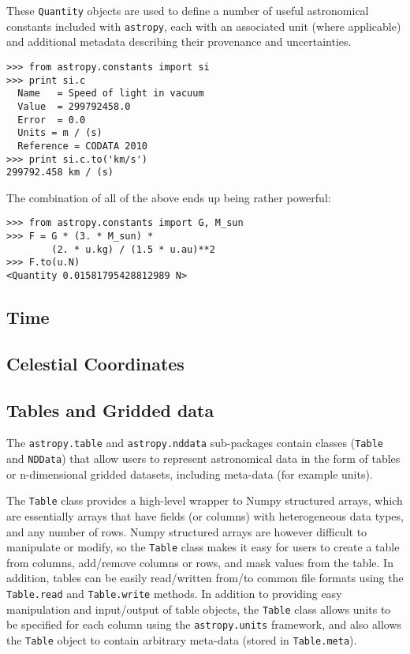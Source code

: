 \documentclass[traditabstract]{aa}
\begin{document}
These \texttt{Quantity} objects are used to define a number of useful
astronomical constants included with \texttt{astropy}, each with an
associated unit (where applicable) and additional metadata describing
their provenance and uncertainties.
\begin{verbatim}
>>> from astropy.constants import si
>>> print si.c
  Name   = Speed of light in vacuum
  Value  = 299792458.0
  Error  = 0.0
  Units = m / (s)
  Reference = CODATA 2010
>>> print si.c.to('km/s')
299792.458 km / (s)
\end{verbatim}

The combination of all of the above ends up being rather powerful:
\begin{verbatim}
>>> from astropy.constants import G, M_sun
>>> F = G * (3. * M_sun) *
        (2. * u.kg) / (1.5 * u.au)**2
>>> F.to(u.N)
<Quantity 0.01581795428812989 N>
\end{verbatim}

\subsection{Time}



\subsection{Celestial Coordinates}



\subsection{Tables and Gridded data}


\label{sec:table}

The \texttt{astropy.table} and \texttt{astropy.nddata} sub-packages contain
classes (\texttt{Table} and \texttt{NDData}) that allow users to represent
astronomical data in the form of tables or n-dimensional gridded datasets,
including meta-data (for example units).

The \texttt{Table} class provides a high-level wrapper to Numpy structured
arrays, which are essentially arrays that have fields (or columns) with
heterogeneous data types, and any number of rows. Numpy structured arrays are
however difficult to manipulate or modify, so the \texttt{Table} class makes
it easy for users to create a table from columns, add/remove columns or rows,
and mask values from the table. In addition, tables can be easily
read/written from/to common file formats using the \texttt{Table.read} and
\texttt{Table.write} methods. In addition to providing easy manipulation and
input/output of table objects, the \texttt{Table} class allows units to be
specified for each column using the \texttt{astropy.units} framework, and
also allows the \texttt{Table} object to contain arbitrary meta-data (stored
in \texttt{Table.meta}).
\end{document}
